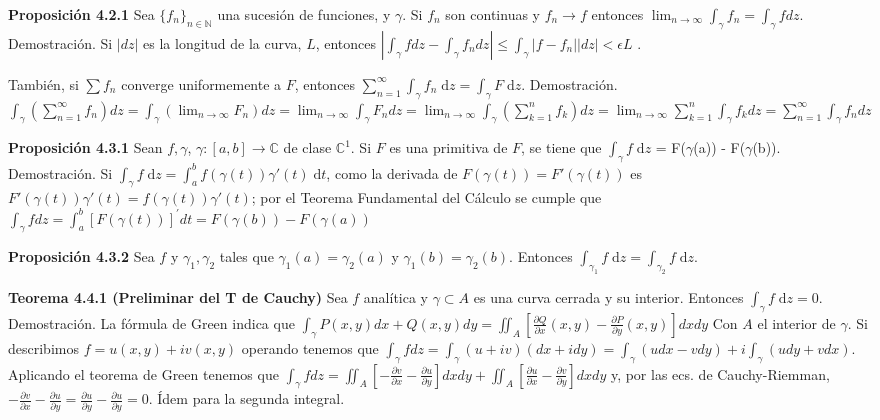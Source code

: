 \documentclass[a4paper, 11pt]{extarticle}
\newcommand{\tma}[1]{\textcolor{rojo}{\textbf{Teorema #1}}}
\newcommand{\propo}[1]{\textcolor{rojo}{\textbf{Proposición #1}}}
\newcommand{\dem}[1]{\textcolor{gris}{\small{Demostración. #1}}}
\begin{document}
\begin{multicols*}{2}
\propo{4.2.1} Sea \(\{ f_n \}_{n \in \mathbb{N}}\) una sucesión de funciones,
y \(\gamma\). Si \(f_n\) son continuas y \(f_n \rightarrow  f\) entonces
\(\lim_{n \to \infty} \int _{\gamma} f_n = \int _\gamma f dz\). 
\dem{ Si \( |dz| \) es la longitud de la curva, \( L \), entonces 
\( \left|\int_{\gamma} f d z-\int_{\gamma} f_{n} d z\right| \leq \int_{\gamma}\left|f-f_{n}\right||d z|<\epsilon L \) }.

También, si \(\sum f_n\) converge uniformemente a \(F\), entonces \(\sum
_{n=1}^{\infty} \int _\gamma f_n \; \text{d}z  = \int _\gamma F \; \text{d}z\). 
\dem{ \(
\int_{\gamma}\left(\sum_{n=1}^{\infty} f_{n}\right) d z =\int_{\gamma}\left(\lim _{n \rightarrow \infty} F_{n}\right) d z=\lim _{n \rightarrow \infty} \int_{\gamma} F_{n} d z 
=\lim _{n \rightarrow \infty} \int_{\gamma}\left(\sum_{k=1}^{n} f_{k}\right) d z=\lim _{n \rightarrow \infty} \sum_{k=1}^{n} \int_{\gamma} f_{k} d z=\sum_{n=1}^{\infty} \int_{\gamma} f_{n} d z
 \)  }


\propo{4.3.1} Sean \(f, \gamma\), \(\gamma: [a,b] \rightarrow  \mathbb{C}\) de clase \(\mathbb{C}^1\). Si
\(F\) es una primitiva de \(F\), se tiene que \(\int _\gamma f \; \text{d}
z\) = F(\(\gamma\)(a)) - F(\(\gamma\)(b)).
\dem{ Si \( \int _\gamma f \; \text{d}z = \int_ { a }^{ b } f(\gamma(t))\gamma'(t) \; \text{d}t   \), como la derivada de 
\( F(\gamma(t)) = F'(\gamma(t)) \) es \(F'(\gamma(t))\gamma'(t) = f(\gamma(t))\gamma'(t) \); por el Teorema Fundamental del Cálculo se cumple 
que \(\int_{\gamma} f d z =\int_{a}^{b}[F(\gamma(t))]^{\prime} d t=F(\gamma(b))-F(\gamma(a)) \)}

\propo{4.3.2} Sea \(f\) y \(\gamma_1, \gamma_2\) tales que \(\gamma_1(a) =
\gamma_2(a)\) y \(\gamma_1(b) = \gamma_2(b)\). Entonces \(\int _{\gamma_1}f
\; \text{d}z  = \int _{\gamma_2}f \; \text{d}z\).


\tma{4.4.1 (Preliminar del T de Cauchy)} Sea \(f\) analítica y \(\gamma
\subset A\) es una curva cerrada y su interior. Entonces \(\int _\gamma f \;
\text{d}z  = 0\).
\dem{ La fórmula de Green indica que \( \int_{\gamma} P(x, y) d x+Q(x, y) d y=\iint_{A}\left[\frac{\partial Q}{\partial x}(x, y)-\frac{\partial P}{\partial y}(x, y)\right] d x d y \)
Con \( A \) el interior de \( \gamma \). Si describimos \( f = u(x,y) + iv(x,y) \) operando
tenemos que 
\(\int_{\gamma} f d z =\int_{\gamma}(u+i v)(d x+i d y) 
=\int_{\gamma}(u d x-v d y)+i \int_{\gamma}(u d y+v d x)\). Aplicando el teorema de Green 
tenemos que \( \int_{\gamma} f d z=\iint_{A}\left[-\frac{\partial v}{\partial x}-\frac{\partial u}{\partial y}\right] d x d y+\iint_{A}\left[\frac{\partial u}{\partial x}-\frac{\partial v}{\partial y}\right] d x d y \)
y, por las ecs. de Cauchy-Riemman, \( - \frac{\partial v}{\partial x} - \frac{\partial u}{\partial y} = 
\frac{\partial u}{\partial y} - \frac{\partial u}{\partial y} = 0\). Ídem para la segunda integral.  }


\end{multicols*}
\end{document}
